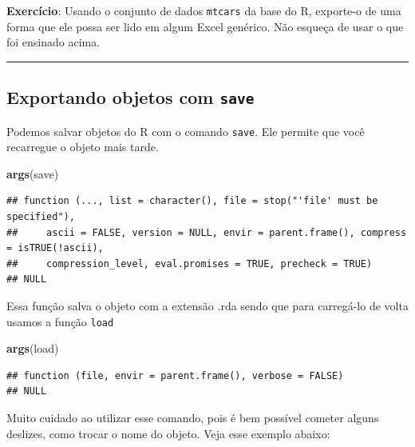 \documentclass[]{book}
\newenvironment{Shaded}{\begin{snugshade}}{\end{snugshade}}
\newcommand{\KeywordTok}[1]{\textcolor[rgb]{0.13,0.29,0.53}{\textbf{#1}}}
\newcommand{\NormalTok}[1]{#1}
\theoremstyle{definition}
\theoremstyle{definition}
\theoremstyle{definition}
\theoremstyle{remark}
\begin{document}
\textbf{Exercício}: Usando o conjunto de dados \texttt{mtcars} da base
do R, exporte-o de uma forma que ele possa ser lido em algum Excel
genérico. Não esqueça de usar o que foi ensinado acima.

\begin{center}\rule{0.5\linewidth}{\linethickness}\end{center}

\subsection{\texorpdfstring{Exportando objetos com
\texttt{save}}{Exportando objetos com save}}\label{exportando-objetos-com-save}

Podemos salvar objetos do R com o comando \texttt{save}. Ele permite que
você recarregue o objeto mais tarde.

\begin{Shaded}
\begin{Highlighting}[]
\KeywordTok{args}\NormalTok{(save)}
\end{Highlighting}
\end{Shaded}

\begin{verbatim}
## function (..., list = character(), file = stop("'file' must be specified"), 
##     ascii = FALSE, version = NULL, envir = parent.frame(), compress = isTRUE(!ascii), 
##     compression_level, eval.promises = TRUE, precheck = TRUE) 
## NULL
\end{verbatim}

Essa função salva o objeto com a extensão .rda sendo que para carregá-lo
de volta usamos a função \texttt{load}

\begin{Shaded}
\begin{Highlighting}[]
\KeywordTok{args}\NormalTok{(load)}
\end{Highlighting}
\end{Shaded}

\begin{verbatim}
## function (file, envir = parent.frame(), verbose = FALSE) 
## NULL
\end{verbatim}

Muito cuidado ao utilizar esse comando, pois é bem possível cometer
alguns deslizes, como trocar o nome do objeto. Veja esse exemplo abaixo:
\end{document}
